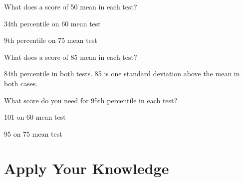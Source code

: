 \documentclass[landscape]{exam}
\begin{document}
  \begin{itemize*}
    \item What does a score of 50 mean in each test?
      \begin{solution}
        \begin{itemize*}
          \item 34th percentile on 60 mean test
          \item 9th percentile on 75 mean test
        \end{itemize*}
      \end{solution}

    \item What does a score of 85 mean in each test?
      \begin{solution}
        84th percentile in both tests.  85 is one standard deviation above the
        mean in both cases.
      \end{solution}

    \item What score do you need for 95th percentile in each test?
      \begin{solution}
        \begin{itemize*}
          \item 101 on 60 mean test
          \item 95 on 75 mean test
        \end{itemize*}
      \end{solution}

  \end{itemize*}

  \section{Apply Your Knowledge} %
\end{document}
